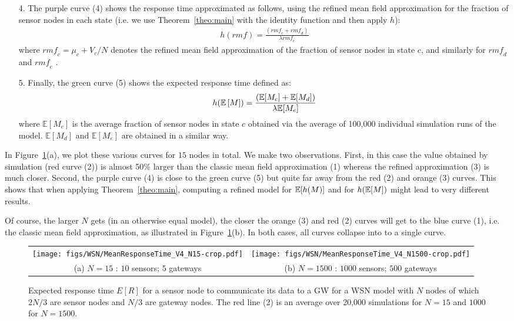 \documentclass[review]{elsarticle}
\begin{document}
\begin{itemize}
\item[4.] The purple curve (4) shows the response time approximated as
  follows, using the refined mean field approximation for the fraction
  of sensor nodes in each state (i.e. we use Theorem~\ref{theo:main}
  with the identity function and then apply $h$):
  \begin{align*}
    h(\mathit{rmf}) = \frac{(\mathit{rmf\!}_c + \mathit{rmf\!}_d)}{\lambda
    \mathit{rmf\!}_e}
  \end{align*}
  where $\mathit{rmf\!}_c=\mu_c+V_c/N$ denotes the refined mean field
  approximation of the fraction of sensor nodes in state $c$, and
  similarly for $\mathit{rmf\!}_d$ and $\mathit{rmf\!}_e$ .
\item[5.] Finally, the green curve (5) shows the expected response time
  defined as:
  \begin{align*}
    h(\esp{M}) = \frac{(\mathbb{E}[M_c] + \mathbb{E}[M_d])}{\lambda
    \mathbb{E}[M_e]}
  \end{align*}
  where $\mathbb{E}[M_c]$ is the average fraction of sensor nodes in
  state $c$ obtained via the average of 100,000 individual simulation
  runs of the model. $\mathbb{E}[M_d]$ and $\mathbb{E}[M_e]$ are obtained in a
  similar way.
\end{itemize}
In Figure~\ref{fig:wsn_res}(a), we plot these various curves for $15$
nodes in total. We make two observations. First, in this case the
value obtained by simulation (red curve (2)) is almost 50\% larger
than the classic mean field approximation (1) whereas the refined
approximation (3) is much closer. Second, the purple curve (4) is
close to the green curve (5) but quite far away from the red (2) and
orange (3) curves. This shows that when applying
Theorem~\ref{theo:main}, computing a refined model for $\esp{h(M)}$
and for $h(\esp{M})$ might lead to very different results.

Of course, the larger $N$ gets (in an otherwise equal model), the
closer the orange (3) and red (2) curves will get to the blue curve (1),
i.e. the classic mean field approximation, as illustrated in
Figure~\ref{fig:wsn_res}(b). In both cases, all curves collapse
into to a single curve. 

\begin{figure}[ht]
\begin{center}
  \begin{tabular}{@{}c@{}c@{}}
    \texttt{[image: figs/WSN/MeanResponseTime\_V4\_N15-crop.pdf]}
    &\texttt{[image: figs/WSN/MeanResponseTime\_V4\_N1500-crop.pdf]}\\
    (a) $N=15$ : $10$ sensors; $5$ gateways
    &(b) $N=1500$ : $1000$ sensors; $500$ gateways
  \end{tabular}
\end{center}

\caption{\label{fig:wsn_res} Expected response time $E[R]$ for a
  sensor node to communicate its data to a GW for a WSN model with $N$
  nodes of which $2N/3$ are sensor nodes and $N/3$ are gateway
  nodes. The red line (2) is an average over 20,000 simulations for
  $N=15$ and $1000$ for $N=1500$.}
\end{figure}
\end{document}
